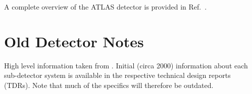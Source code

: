A complete overview of the ATLAS detector is provided in Ref.~\cite{PERF-2007-01}.


%
%
%



\section{Old Detector Notes}

High level information taken from \cite{PERF-2007-01}. Initial (circa 2000) information about each sub-detector system is available in the respective technical design reports (TDRs). Note that much of the specifics will therefore be outdated.

